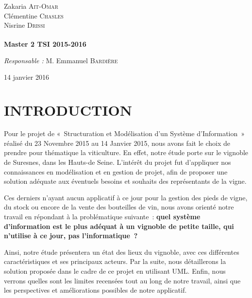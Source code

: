 \documentclass[a4paper, titlepage]{report}
\begin{document}
\begin{titlepage}
\begin{sffamily}
\begin{center}
    \begin{minipage}{0.4\textwidth}
      \begin{flushleft} \large
        Zakaria \textsc{Ait-Omar}\\
        Clémentine \textsc{Chasles}\\
        Nisrine \textsc{Drissi}\\ 
        \\
        \textbf{Master 2 TSI 2015-2016}\\
      \end{flushleft}
    \end{minipage}
    \begin{minipage}{0.4\textwidth}
      \begin{flushright} \large
        \emph{Responsable :} M. Emmanuel \textsc{Bardière}\\
      \end{flushright}
    \end{minipage}

    \vfill

    {\large 14 janvier 2016}

  \end{center}
  \end{sffamily}
\end{titlepage}

\chapter{INTRODUCTION}

Pour le projet de «~Structuration et Modélisation d'un Système
d'Information~» réalisé du 23 Novembre 2015 au 14 Janvier 2015, nous
avons fait le choix de prendre pour thématique la viticulture. En effet,
notre étude porte sur le vignoble de Suresnes, dans les Hauts-de Seine.
L'intérêt du projet fut d'appliquer nos connaissances en modélisation et
en gestion de projet, afin de proposer une solution adéquate aux
éventuels besoins et souhaits des représentants de la vigne.

Ces derniers n'ayant aucun applicatif à ce jour pour la gestion des
pieds de vigne, du stock ou encore de la vente des bouteilles de vin,
nous avons orienté notre travail en répondant à la problématique
suivante~: \textbf{quel système d'information est le plus adéquat à un
vignoble de petite taille, qui n'utilise à ce jour, pas
l'informatique~?}

Ainsi, notre étude présentera un état des lieux du vignoble, avec ces
différentes caractéristiques et ses principaux acteurs. Par la suite,
nous détaillerons la solution proposée dans le cadre de ce projet en
utilisant UML. Enfin, nous verrons quelles sont les limites recensées
tout au long de notre travail, ainsi que les perspectives et
améliorations possibles de notre applicatif.
\end{document}

